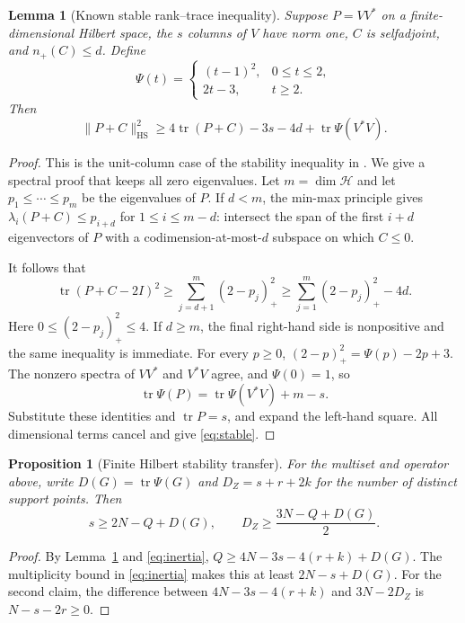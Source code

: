 ﻿\documentclass[11pt]{article}
\newtheorem{proposition}[theorem]{Proposition}
\newtheorem{lemma}[theorem]{Lemma}
\theoremstyle{remark}
\DeclareMathOperator{\tr}{tr}
\newcommand{\HS}{\mathrm{HS}}
\begin{document}
\begin{lemma}[Known stable rank--trace inequality]\label{lem:stable}
Suppose $P=VV^*$ on a finite-dimensional Hilbert space, the $s$ columns of
$V$ have norm one, $C$ is selfadjoint, and $n_+(C)\le d$. Define
\[
 \Psi(t)=\begin{cases}(t-1)^2,&0\le t\le2,\\2t-3,&t\ge2.
 \end{cases}
\]
Then
\begin{equation}\label{eq:stable}
 \|P+C\|_{\HS}^2\ge4\tr(P+C)-3s-4d+\tr\Psi(V^*V).
\end{equation}
\end{lemma}
\begin{proof}
This is the unit-column case of the stability inequality in
\cite[Section 2]{Ainta}. We give a spectral proof that keeps all zero
eigenvalues. Let $m=\dim\mathcal H$ and let $p_1\le\cdots\le p_m$ be the
eigenvalues of $P$. If $d<m$, the min-max principle gives
$\lambda_i(P+C)\le p_{i+d}$ for $1\le i\le m-d$: intersect the span
of the first $i+d$ eigenvectors of $P$ with a codimension-at-most-$d$
subspace on which $C\le0$.

It follows that
\[
 \tr(P+C-2I)^2\ge\sum_{j=d+1}^m(2-p_j)_+^2
 \ge\sum_{j=1}^m(2-p_j)_+^2-4d.
\]
Here $0\le(2-p_j)_+^2\le4$. If $d\ge m$, the final right-hand side is
nonpositive and the same inequality is immediate. For every $p\ge0$,
$(2-p)_+^2=\Psi(p)-2p+3$. The nonzero spectra of $VV^*$ and $V^*V$
agree, and $\Psi(0)=1$, so
\[
 \tr\Psi(P)=\tr\Psi(V^*V)+m-s.
\]
Substitute these identities and $\tr P=s$, and expand the left-hand
square. All dimensional terms cancel and give \eqref{eq:stable}.
\end{proof}

\begin{proposition}[Finite Hilbert stability transfer]\label{prop:finite}
For the multiset and operator above, write $D(G)=\tr\Psi(G)$ and
$D_Z=s+r+2k$ for the number of distinct support points. Then
\begin{equation}\label{eq:finite}
 s\ge2N-Q+D(G),\qquad
 D_Z\ge\frac{3N-Q+D(G)}2.
\end{equation}
\end{proposition}
\begin{proof}
By Lemma~\ref{lem:stable} and \eqref{eq:inertia},
$Q\ge4N-3s-4(r+k)+D(G)$. The multiplicity bound in
\eqref{eq:inertia} makes this at least $2N-s+D(G)$. For the second
claim, the difference between $4N-3s-4(r+k)$ and $3N-2D_Z$ is
$N-s-2r\ge0$.
\end{proof}
\end{document}

